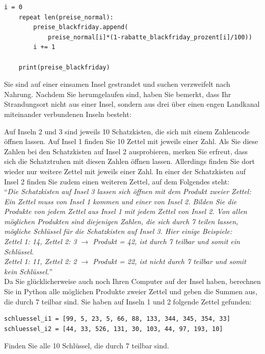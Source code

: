 \begin{questions}
\begin{solution}
\begin{lstlisting}[style=TigerJython]
    i = 0
    repeat len(preise_normal):
        preise_blackfriday.append(
            preise_normal[i]*(1-rabatte_blackfriday_prozent[i]/100))
        i += 1

    print(preise_blackfriday)
    \end{lstlisting}
	\end{solution}

\clearpage
{}

Sie sind auf einer einsamen Insel gestrandet und suchen verzweifelt nach Nahrung. Nachdem Sie herumgelaufen sind, haben Sie bemerkt, dass Ihr Strandungsort nicht aus einer Insel, sondern aus drei über einen engen Landkanal miteinander verbundenen Inseln besteht:
\begin{figure}[H]
	\centering
\end{figure}
Auf Inseln 2 und 3 sind jeweils 10 Schatzkisten, die sich mit einem Zahlencode öffnen lassen. Auf Insel 1 finden Sie 10 Zettel mit jeweils einer Zahl. Als Sie diese Zahlen bei den Schatzkisten auf Insel 2 ausprobieren, merken Sie erfreut, dass sich die Schatztruhen mit diesen Zahlen öffnen lassen. Allerdings finden Sie dort wieder nur weitere Zettel mit jeweils einer Zahl. In einer der Schatzkisten auf Insel 2 finden Sie zudem einen weiteren Zettel, auf dem Folgendes steht:\\

``\textit{Die Schatzkisten auf Insel 3 lassen sich öffnen mit dem Produkt zweier Zettel: Ein Zettel muss von Insel 1 kommen und einer von Insel 2. Bilden Sie die Produkte von jedem Zettel aus Insel 1 mit jedem Zettel von Insel 2. Von allen möglichen Produkten sind diejenigen Zahlen, die sich durch 7 teilen lassen, mögliche Schlüssel für die Schatzkisten auf Insel 3. Hier einige Beispiele:\\
Zettel 1: 14, Zettel 2: 3 $\rightarrow$ Produkt = 42, ist durch 7 teilbar und somit ein Schlüssel.\\
Zettel 1: 11, Zettel 2: 2 $\rightarrow$ Produkt = 22, ist nicht durch 7 teilbar und somit kein Schlüssel.}''\\

Da Sie glücklicherweise auch noch Ihren Computer auf der Insel haben, berechnen Sie in Python alle möglichen Produkte zweier Zettel und geben die Summen aus, die durch 7 teilbar sind. Sie haben auf Inseln 1 und 2 folgende Zettel gefunden:
\begin{lstlisting}[style=TigerJython]
schluessel_i1 = [99, 5, 23, 5, 66, 88, 133, 344, 345, 354, 33]
schluessel_i2 = [44, 33, 526, 131, 30, 103, 44, 97, 193, 10]
\end{lstlisting}
Finden Sie alle 10 Schlüssel, die durch 7 teilbar sind.


\end{questions}
